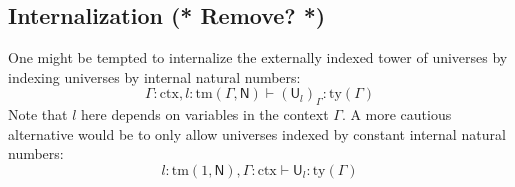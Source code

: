 \documentclass[11pt,a4paper]{article}
\theoremstyle{plain}
\theoremstyle{definition}
\newcommand{\UU}{\mathsf{U}}
\def\UU{\mathsf{U}}
\newcommand{\N}{\mathsf{N}}
\newcommand{\ctx}{\mathrm{ctx}}
\newcommand{\ty}{\mathrm{ty}}
\newcommand{\tm}{\mathrm{tm}}
\def\U{\mathsf{U}}
\newcommand{\Ta}{\mathrm{T}}
\begin{document}
%
%

\subsection{Internalization (* Remove? *)}
One might be tempted to internalize the externally indexed tower of universes by indexing universes by internal natural numbers: 
$$\Gamma : \ctx, l : \tm(\Gamma,\N) \vdash (\UU_l)_\Gamma : \ty(\Gamma)$$
Note that $l$ here depends on variables in the context $\Gamma$. 
A more cautious alternative would be to only
allow universes indexed by constant internal natural numbers:
$$ l : \tm(1,\N), \Gamma : \ctx \vdash \UU_l : \ty(\Gamma)$$
\end{document}
